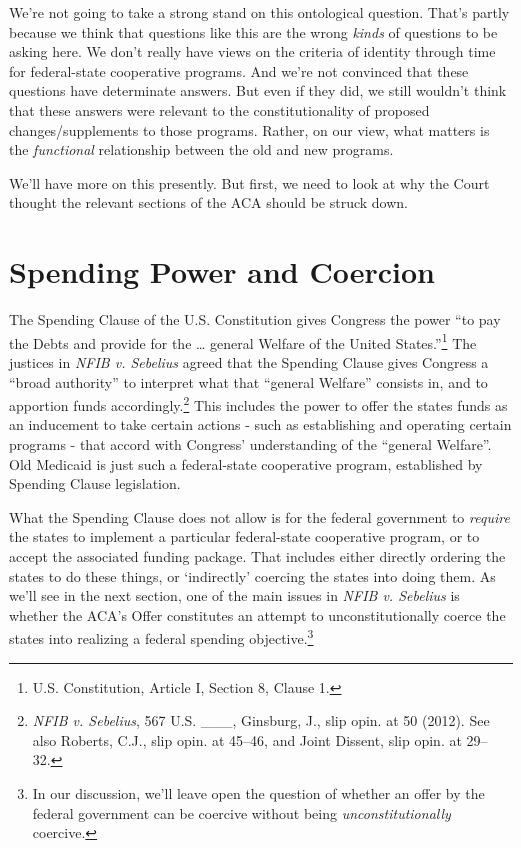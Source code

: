 \documentclass[
  10pt,
  letterpaper,
  DIV=11,
  numbers=noendperiod,
  twoside]{scrartcl}
\begin{document}
We're not going to take a strong stand on this ontological question.
That's partly because we think that questions like this are the wrong
\emph{kinds} of questions to be asking here. We don't really have views
on the criteria of identity through time for federal-state cooperative
programs. And we're not convinced that these questions have determinate
answers. But even if they did, we still wouldn't think that these
answers were relevant to the constitutionality of proposed
changes/supplements to those programs. Rather, on our view, what matters
is the \emph{functional} relationship between the old and new programs.

We'll have more on this presently. But first, we need to look at why the
Court thought the relevant sections of the ACA should be struck down.

\section{Spending Power and Coercion}\label{spending-power-and-coercion}

The Spending Clause of the U.S. Constitution gives Congress the power
``to pay the Debts and provide for the \ldots{} general Welfare of the
United States.''\footnote{U.S. Constitution, Article I, Section 8,
  Clause 1.} The justices in \emph{NFIB v. Sebelius} agreed that the
Spending Clause gives Congress a ``broad authority'' to interpret what
that ``general Welfare'' consists in, and to apportion funds
accordingly.\footnote{\emph{NFIB v. Sebelius}, 567 U.S. \_\_\_,
  Ginsburg, J., slip opin. at 50 (2012). See also Roberts, C.J., slip
  opin. at 45--46, and Joint Dissent, slip opin. at 29--32.} This
includes the power to offer the states funds as an inducement to take
certain actions - such as establishing and operating certain programs -
that accord with Congress' understanding of the ``general Welfare''. Old
Medicaid is just such a federal-state cooperative program, established
by Spending Clause legislation.

What the Spending Clause does not allow is for the federal government to
\emph{require} the states to implement a particular federal-state
cooperative program, or to accept the associated funding package. That
includes either directly ordering the states to do these things, or
`indirectly' coercing the states into doing them. As we'll see in the
next section, one of the main issues in \emph{NFIB v. Sebelius} is
whether the ACA's Offer constitutes an attempt to unconstitutionally
coerce the states into realizing a federal spending
objective.\footnote{In our discussion, we'll leave open the question of
  whether an offer by the federal government can be coercive without
  being \emph{unconstitutionally} coercive.}
\end{document}
